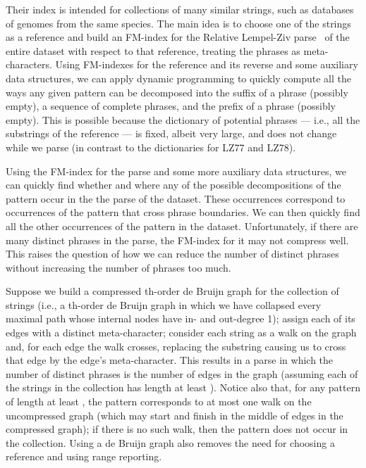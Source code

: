\documentclass[a4paper,UKenglish]{lipics-v2016}
\begin{document}
Their index is intended for collections of many similar strings, such as databases of genomes from the same species.  The main idea is to choose one of the strings as a reference and build an FM-index for the Relative Lempel-Ziv parse~\cite{KPZ10} of the entire dataset with respect to that reference, treating the phrases as meta-characters.  Using FM-indexes for the reference and its reverse and some auxiliary data structures, we can apply dynamic programming to quickly compute all the ways any given pattern can be decomposed into the suffix of a phrase (possibly empty), a sequence of complete phrases, and the prefix of a phrase (possibly empty).  This is possible because the dictionary of potential phrases --- i.e., all the substrings of the reference --- is fixed, albeit very large, and does not change while we parse (in contrast to the dictionaries for LZ77 and LZ78).

Using the FM-index for the parse and some more auxiliary data structures, we can quickly find whether and where any of the possible decompositions of the pattern occur in the the parse of the dataset.  These occurrences correspond to occurrences of the pattern that cross phrase boundaries.  We can then quickly find all the other occurrences of the pattern in the dataset.  Unfortunately, if there are many distinct phrases in the parse, the FM-index for it may not compress well.  This raises the question of how we can reduce the number of distinct phrases without increasing the number of phrases too much.

Suppose we build a compressed th-order de Bruijn graph for the collection of strings (i.e., a th-order de Bruijn graph in which we have collapsed every maximal path whose internal nodes have in- and out-degree 1); assign each of its edges with a distinct meta-character; consider each string as a walk on the graph and, for each edge the walk crosses, replacing the substring causing us to cross that edge by the edge's meta-character.  This results in a parse in which the number of distinct phrases is the number of edges in the graph (assuming each of the strings in the collection has length at least ).  Notice also that, for any pattern of length at least , the pattern corresponds to at most one walk on the uncompressed graph (which may start and finish in the middle of edges in the compressed graph); if there is no such walk, then the pattern does not occur in the collection.  Using a de Bruijn graph also removes the need for choosing a reference and using range reporting.
\end{document}
